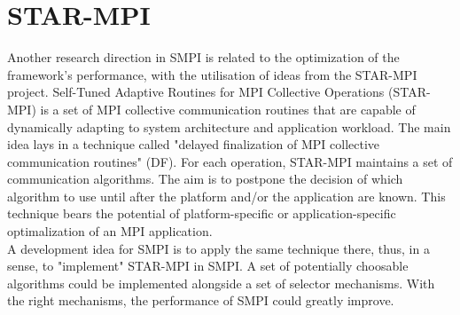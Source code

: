 \section{STAR-MPI}
Another research direction in SMPI is related to the optimization of
the framework's performance, with the utilisation of ideas from the
STAR-MPI project.
Self-Tuned Adaptive Routines for MPI Collective Operations (STAR-MPI)
is a set of MPI collective communication routines that are capable of
dynamically adapting to system architecture and application
workload. The main idea lays in a technique called "delayed
finalization of MPI collective communication routines" (DF). For each
operation, STAR-MPI maintains a set of communication algorithms. The
aim is to postpone the decision of which algorithm to use until after
the platform and/or the application are known. This technique bears
the potential of platform-specific or application-specific
optimalization of an MPI application.\cite{fyl06}\\
A development idea for SMPI is to apply the same technique there,
thus, in a sense, to "implement" STAR-MPI in SMPI. A set of
potentially choosable algorithms could be implemented alongside a set
of selector mechanisms. With the right mechanisms, the performance of
SMPI could greatly improve.

